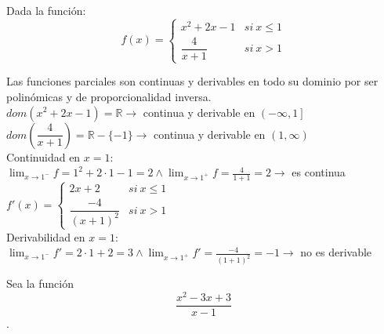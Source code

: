 \documentclass[addpoints,spanish, 12pt,a4paper]{exam}
\begin{document}
\begin{questions}
\question Dada la función:
$$f(x)=\begin{cases} x^{2} + 2 x - 1 & si \ x \leq 1 \\\dfrac{4}{x + 1} & si \ x > 1\end{cases}$$ 

\begin{solution} Las funciones parciales son continuas y derivables en todo su dominio por ser polinómicas y de proporcionalidad inversa. \\
$dom(x^{2} + 2 x - 1)=\mathbb{R} \to$ continua y derivable en $\left(- \infty , 1 \right]$ \\
$ dom(\dfrac{4}{x + 1})= \mathbb{R}-\{ -1 \} \to $ continua y derivable en $\left(1 , \infty \right)$\\
Continuidad en $x=1$: \\
$\lim_{x \to 1^-} f =1^2+2\cdot 1-1=2 \land \lim_{x \to 1^+} f =\frac{4}{1+1}=2 \to$ es continua
$f'(x)=\begin{cases} 2x + 2 & si \ x \leq 1 \\\dfrac{-4}{(x + 1)^2} & si \ x > 1\end{cases}$ \\
Derivabilidad en $x=1$: \\
$\lim_{x \to 1^-}f'=2\cdot 1+2=3 \land \lim_{x \to 1^+}f'=\frac{-4}{(1+1)^2}=-1 \to$ no es derivable


 

 \end{solution}


\addpoints


\question Sea la función  $$\frac{x^{2} - 3 x + 3}{x - 1}$$.
\begin{parts}

\end{parts}
\end{questions}
\end{document}
